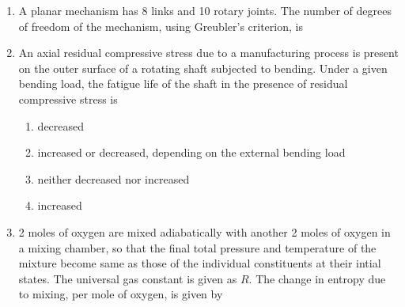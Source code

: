 \documentclass[journal,12pt,onecolumn]{IEEEtran}
\begin{document}
\begin{enumerate}
    \item A planar mechanism has 8 links and 10 rotary joints. The number of degrees of freedom of the mechanism, using Greubler's criterion, is
          \begin{enumerate}
          \end{enumerate}

    \item An axial residual compressive stress due to a manufacturing process is present on the outer surface of a rotating shaft subjected to bending. Under a given bending load, the fatigue life of the shaft in the presence of residual compressive stress is
          \begin{enumerate}
              \item decreased
              \item increased or decreased, depending on the external bending load
              \item neither decreased nor increased
              \item increased
          \end{enumerate}

    \item 2 moles of oxygen are mixed adiabatically with another 2 moles of oxygen in a mixing chamber, so that the final total pressure and temperature of the mixture become same as those of the individual constituents at their intial states. The universal gas constant is given as $R$. The change in entropy due to mixing, per mole of oxygen, is given by
          \begin{enumerate}
          \end{enumerate}


\end{enumerate}
\end{document}
